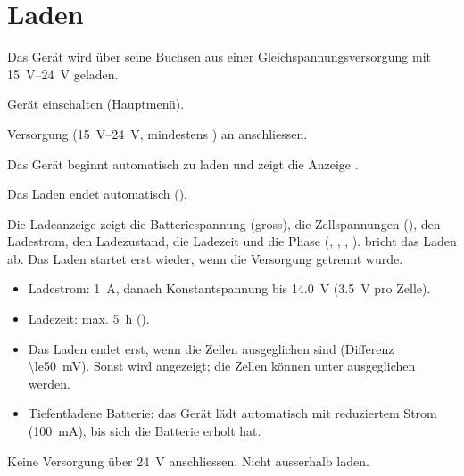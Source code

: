 \section{Laden}
\label{sec:charging}

Das Gerät wird über seine Buchsen aus einer Gleichspannungsversorgung mit \qtyrange{15}{24}{\volt} geladen.

\begin{steps}
    \item Gerät einschalten (Hauptmenü).
    \item Versorgung (\qtyrange{15}{24}{\volt}, mindestens ) an  anschliessen.
    \item Das Gerät beginnt automatisch zu laden und zeigt die Anzeige .
    \item Das Laden endet automatisch ().
\end{steps}

Die Ladeanzeige zeigt die Batteriespannung (gross), die Zellspannungen (), den
Ladestrom, den Ladezustand, die Ladezeit und die Phase (, ,
, ).  bricht das Laden ab. Das Laden startet erst wieder, wenn die
Versorgung getrennt  wurde.

\begin{itemize}
    \item Ladestrom: \qty{1}{\ampere}, danach Konstantspannung bis \qty{14.0}{\volt} (\qty{3.5}{\volt} pro Zelle).
    \item Ladezeit: max. \qty{5}{\hour} ().
    \item Das Laden endet erst, wenn die Zellen ausgeglichen sind (Differenz \qty{\le50}{\milli\volt}).
          Sonst wird  angezeigt; die Zellen können unter
           ausgeglichen werden.
    \item Tiefentladene Batterie: das Gerät lädt automatisch mit reduziertem Strom
          (\qty{100}{\milli\ampere}), bis sich die Batterie erholt hat.
\end{itemize}

\begin{caution}
    Keine Versorgung über \qty{24}{\volt} anschliessen. Nicht ausserhalb  laden.
\end{caution}
